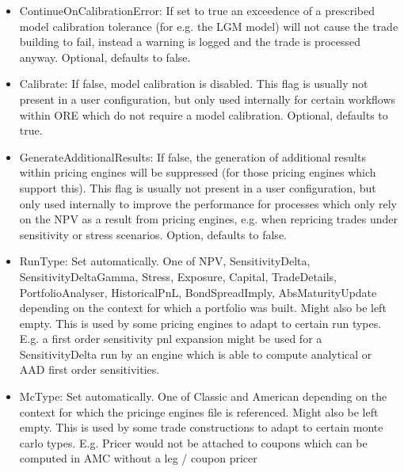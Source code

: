 \begin{itemize}
\item ContinueOnCalibrationError: If set to true an exceedence of a prescribed model calibration tolerance (for e.g. the
  LGM model) will not cause the trade building to fail, instead a warning is logged and the trade is processed
  anyway. Optional, defaults to false.
\item Calibrate: If false, model calibration is disabled. This flag is usually not present in a user configuration, but
  only used internally for certain workflows within ORE which do not require a model calibration. Optional, defaults to
  true.
\item GenerateAdditionalResults: If false, the generation of additional results within pricing engines will be
  suppressed (for those pricing engines which support this). This flag is usually not present in a user configuration,
  but only used internally to improve the performance for processes which only rely on the NPV as a result from pricing
  engines, e.g. when repricing trades under sensitivity or stress scenarios. Option, defaults to false.
\item RunType: Set automatically. One of NPV, SensitivityDelta, SensitivityDeltaGamma, Stress, Exposure, Capital,
  TradeDetails, PortfolioAnalyser, HistoricalPnL, BondSpreadImply, AbsMaturityUpdate depending on the context for which
  a portfolio was built. Might also be left empty. This is used by some pricing engines to adapt to certain run
  types. E.g. a first order sensitivity pnl expansion might be used for a SensitivityDelta run by an engine which is
  able to compute analytical or AAD first order sensitivities.
\item McType: Set automatically. One of Classic and American depending on the context for which the pricinge engines 
  file is referenced. Might also be left empty. This is used by some trade constructions to adapt to certain monte carlo
  types. E.g. Pricer would not be attached to coupons which can be computed in AMC without a leg / coupon pricer
\end{itemize}
